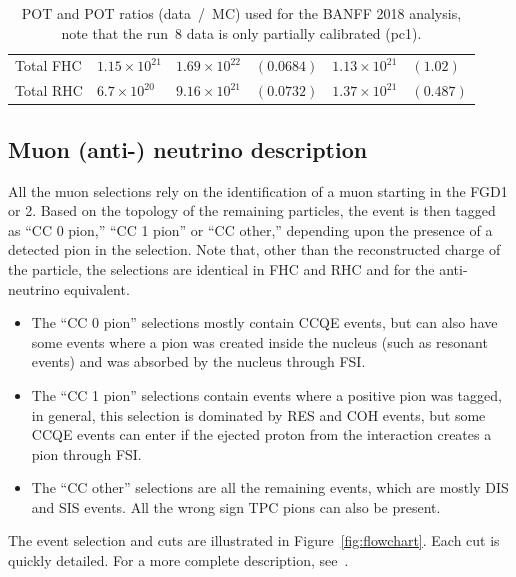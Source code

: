 \begin{table}[ht]
\begin{adjustbox}{center}
\begin{tabular}{llllll}
      \midrule
      Total \Gls{FHC} & $1.15\times 10^{21}$ & $1.69\times 10^{22}$&$(0.0684)$ & $1.13\times 10^{21}$&$(1.02) $ \\ 
      Total \Gls{RHC} & $6.7 \times 10^{20}$ & $9.16\times 10^{21}$&$(0.0732)$ & $1.37\times 10^{21}$&$(0.487)$ \\ 
      \bottomrule
    \end{tabular}
  \end{adjustbox}
  \caption[POT and POT ratios (data~/~MC) used for the 2018 BANFF
  analysis]{\Gls{POT} and \Gls{POT} ratios (data~/~\Gls{MC}) used for
    the \Gls{BANFF} 2018 analysis, note that the run~8 data is only
    partially calibrated (\gls{pc1}).}
  \label{tab:POTBANFF}
\end{table}

\subsection{Muon (anti-) neutrino  description}
\label{subsec:muonneutrinoselection}
All the muon selections rely on the identification of a muon starting
in the \Gls{FGD}1 or 2. Based on the topology of the remaining
particles, the event is then tagged as ``\Gls{CC} 0 pion,'' ``\Gls{CC}
1 pion'' or ``\Gls{CC} other,'' depending upon the presence of a
detected pion in the selection. Note that, other than the
reconstructed charge of the particle, the selections are identical in
\Gls{FHC} and \Gls{RHC} and for the anti-neutrino equivalent.
\begin{itemize}[noitemsep,topsep=0pt]
\item The ``\Gls{CC} 0 pion'' selections mostly contain \Gls{CCQE}
  events, but can also have some events where a pion was created
  inside the nucleus (such as resonant events) and was absorbed by the
  nucleus through \Gls{FSI}.
\item The ``\Gls{CC} 1 pion'' selections contain events where a
  positive pion was tagged, in general, this selection is dominated by
  \Gls{RES} and \Gls{COH} events, but some \Gls{CCQE} events can enter
  if the ejected proton from the interaction creates a pion through
  \Gls{FSI}.
\item The ``\Gls{CC} other'' selections are all the remaining events,
  which are mostly \Gls{DIS} and \Gls{SIS} events. All the wrong sign
  \Gls{TPC} pions can also be present.
\end{itemize}

The event selection and cuts are illustrated in
Figure~\ref{fig:flowchart}. Each cut is quickly detailed. For a more
complete description, see~\cite{TN152,TN212}.


